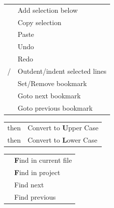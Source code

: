 \documentclass[a4paper]{article}
\newenvironment{keytable}[1]{%
  \begin{tabular}{|>{\rule{0pt}{0.85\normalbaselineskip}}l|l|}
  \hline
  \rowcolor[gray]{.8}
  \multicolumn{2}{|l|}{\bfseries #1}\\ \hline
}{%
  \end{tabular}\par\vspace{5mm}%
}
\begin{document}
\begin{center}
\begin{multicols*}{2}
\begin{keytable}{Editing}
\keys{Alt + Shift + Down}                                  & Add selection below \\ \hline

\keys{Ctrl + Ins}                                          & Copy selection \\ \hline
\keys{Shift + Ins}                                         & Paste \\ \hline

\keys{Ctrl + z}                                            & Undo \\ \hline
\keys{Ctrl + Shift + z}                                    & Redo \\ \hline

\keys{Ctrl + [} / \keys{]}                                 & Outdent/indent selected lines \\ \hline %

\keys{Ctrl + Shift + F2}                                   & Set/Remove bookmark \\ \hline
\keys{F2}                                                  & Goto next bookmark \\ \hline
\keys{Shift + F2}                                          & Goto previous bookmark \\ \hline
\end{keytable}

\begin{keytable}{Character Transformations}
\keys{Ctrl + k} then \keys{Ctrl + \textbf{u}}              & Convert to \textbf{U}pper Case \\ \hline
\keys{Ctrl + k} then \keys{Ctrl + \textbf{l}}              & Convert to \textbf{L}ower Case \\ \hline %
\end{keytable}

\begin{keytable}{Find and Replace}
\keys{Ctrl + \textbf{f}}                                   & \textbf{F}ind in current file \\ \hline
\keys{Ctrl + Shift + \textbf{f}}                           & \textbf{F}ind in project \\ \hline
\keys{F3}                                                  & Find next \\ \hline
\keys{Shift + F3}                                          & Find previous \\ \hline
\end{keytable}


\end{multicols*}
\end{center}
\end{document}
